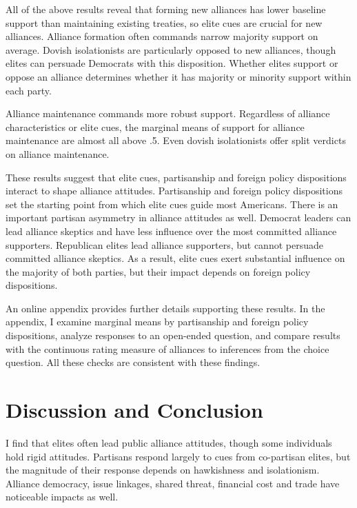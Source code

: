 \documentclass[12pt]{article}
\begin{document}
All of the above results reveal that forming new alliances has lower baseline support than maintaining existing treaties, so elite cues are crucial for new alliances. 
Alliance formation often commands narrow majority support on average.
Dovish isolationists are particularly opposed to new alliances, though elites can persuade Democrats with this disposition. 
Whether elites support or oppose an alliance determines whether it has majority or minority support within each party. 


Alliance maintenance commands more robust support. 
Regardless of alliance characteristics or elite cues, the marginal means of support for alliance maintenance are almost all above .5. 
Even dovish isolationists offer split verdicts on alliance maintenance.


These results suggest that elite cues, partisanship and foreign policy dispositions interact to shape alliance attitudes.
Partisanship and foreign policy dispositions set the starting point from which elite cues guide most Americans. 
There is an important partisan asymmetry in alliance attitudes as well. 
Democrat leaders can lead alliance skeptics and have less influence over the most committed alliance supporters. 
Republican elites lead alliance supporters, but cannot persuade committed alliance skeptics. 
As a result, elite cues exert substantial influence on the majority of both parties, but their impact depends on foreign policy dispositions. 


An online appendix provides further details supporting these results. 
In the appendix, I examine marginal means by partisanship and foreign policy dispositions, analyze responses to an open-ended question, and compare results with the continuous rating measure of alliances to inferences from the choice question.
All these checks are consistent with these findings. 


\section{Discussion and Conclusion} 


I find that elites often lead public alliance attitudes, though some individuals hold rigid attitudes. 
Partisans respond largely to cues from co-partisan elites, but the magnitude of their response depends on hawkishness and isolationism. 
Alliance democracy, issue linkages, shared threat, financial cost and trade have noticeable impacts as well.  
\end{document}

